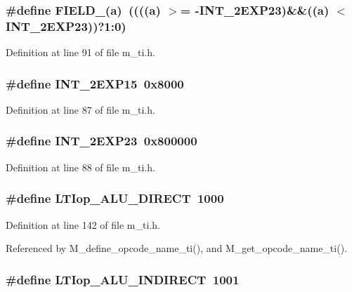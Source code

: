 \subsubsection{\setlength{\rightskip}{0pt plus 5cm}\#define FIELD\_(a)~((((a) $>$= -INT\_\-2EXP23)\&\&((a) $<$ INT\_\-2EXP23))?1:0)}\label{m__ti_8h_4145b8fc24adfe0ff9dd955ae721fd56}




Definition at line 91 of file m\_\-ti.h.
\subsubsection{\setlength{\rightskip}{0pt plus 5cm}\#define INT\_\-2EXP15~0x8000}\label{m__ti_8h_813ee2c6d373065fdac967065aaa5fb1}




Definition at line 87 of file m\_\-ti.h.
\subsubsection{\setlength{\rightskip}{0pt plus 5cm}\#define INT\_\-2EXP23~0x800000}\label{m__ti_8h_f04078494a23fda9fc8c67287812a706}




Definition at line 88 of file m\_\-ti.h.
\subsubsection{\setlength{\rightskip}{0pt plus 5cm}\#define LTIop\_\-ALU\_\-DIRECT~1000}\label{m__ti_8h_0b383e497c4db0481598aed0ca1614e8}




Definition at line 142 of file m\_\-ti.h.

Referenced by M\_\-define\_\-opcode\_\-name\_\-ti(), and M\_\-get\_\-opcode\_\-name\_\-ti().
\subsubsection{\setlength{\rightskip}{0pt plus 5cm}\#define LTIop\_\-ALU\_\-INDIRECT~1001}\label{m__ti_8h_7efc0831d265d9a770ef469176867aaa}





